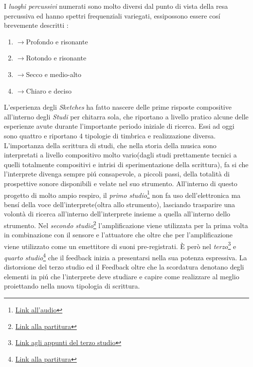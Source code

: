 \documentclass[oneside]{article}
\begin{document}
\begin{multicols*}{2}
I \textit{luoghi percussivi} numerati sono molto diversi dal punto di vista della resa percussiva ed hanno spettri frequenziali variegati, essipossono essere cosí brevemente descritti :
\begin{enumerate}
\item $\longrightarrow$Profondo e risonante 
\item $\longrightarrow$Rotondo e risonante
\item $\longrightarrow$Secco e medio-alto
\item $\longrightarrow$Chiaro e deciso
\end{enumerate}

L'esperienza degli \textit{Sketches} ha fatto nascere delle prime risposte compositive all'interno degli \textit{Studi} per chitarra sola, che riportano a livello pratico alcune delle esperienze avute durante l'importante periodo iniziale di ricerca. Essi ad oggi sono quattro e riportano 4 tipologie di timbrica e realizzazione diversa.
L'importanza della scrittura di studi, che nella storia della musica sono interpretati a livello compositivo molto vario(dagli studi prettamente tecnici a quelli totalmente compositivi e intrisi di sperimentazione della scrittura), fa si che l'interprete divenga sempre piú consapevole, a piccoli passi, della totalità di prospettive sonore disponibili e velate nel suo strumento. All'interno di questo progetto di molto ampio respiro, il \textit{primo studio}\footnote{\href{https://github.com/SMERM/BN-Tedesco/blob/master/COME-02/Lezioni_in_Compresenza/20200331/Draft_1_Studio_n.1_Audio.wav}{Link all'audio}} non fa uso dell'elettronica ma bensí della voce dell'interprete(oltra allo strumento), lasciando trasparire una volontà di ricerca all'interno dell'interprete insieme a quella all'interno dello strumento. Nel \textit{secondo studio}\footnote{\href{https://github.com/SMERM/BN-Tedesco/blob/master/COME-02/Lezioni_in_Compresenza/20200407/Draft_1\%20Studio\%20n.2\%20Partitura.pdf}{Link alla partitura}} l'amplificazione viene utilizzata per la prima volta in combinazione con il sensore e l'attuatore che oltre che per l'amplificazione viene utilizzato come un emettitore di suoni pre-registrati. È però nel \textit{terzo}\footnote{\href{https://github.com/SMERM/BN-Tedesco/blob/master/COME-02/Lezioni_in_Compresenza/20200519/Appunti_Studio_n.3_a.jpeg}{Link agli appunti del terzo studio}} e \textit{quarto studio}\footnote{\href{https://github.com/SMERM/BN-Tedesco/blob/master/COME-02/Lezioni_in_Compresenza/20200616/Studio_n.4_a.pdf}{Link alla partitura}} che il feedback inizia a presentarsi nella sua potenza espressiva. La distorsione del terzo studio ed il Feedback oltre che la scordatura denotano degli elementi in piú che l'interprete deve studiare e capire come realizzare al meglio proiettando nella nuova tipologia di scrittura.


\end{multicols*}
\end{document}
